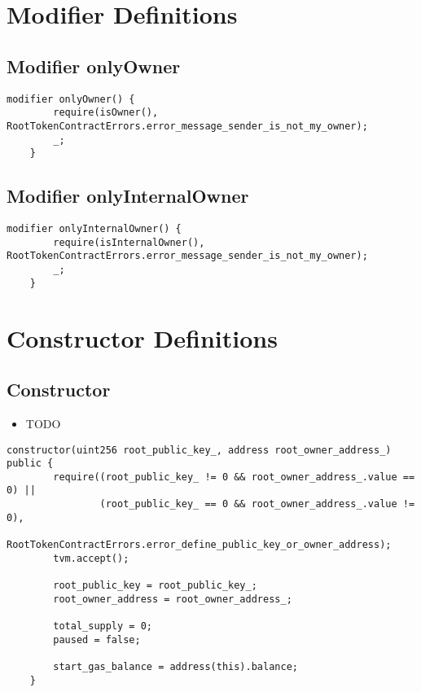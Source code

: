 \section{Modifier Definitions}


\subsection{Modifier onlyOwner}


\begin{lstlisting}[firstnumber=459]
    modifier onlyOwner() {
        require(isOwner(), RootTokenContractErrors.error_message_sender_is_not_my_owner);
        _;
    }
\end{lstlisting}

\subsection{Modifier onlyInternalOwner}


\begin{lstlisting}[firstnumber=464]
    modifier onlyInternalOwner() {
        require(isInternalOwner(), RootTokenContractErrors.error_message_sender_is_not_my_owner);
        _;
    }
\end{lstlisting}

\section{Constructor Definitions}


\subsection{Constructor}

\noindent\begin{itemize}
\item TODO
\end{itemize}

\begin{lstlisting}[firstnumber=49]
    constructor(uint256 root_public_key_, address root_owner_address_) public {
        require((root_public_key_ != 0 && root_owner_address_.value == 0) ||
                (root_public_key_ == 0 && root_owner_address_.value != 0),
                RootTokenContractErrors.error_define_public_key_or_owner_address);
        tvm.accept();

        root_public_key = root_public_key_;
        root_owner_address = root_owner_address_;

        total_supply = 0;
        paused = false;

        start_gas_balance = address(this).balance;
    }
\end{lstlisting}

